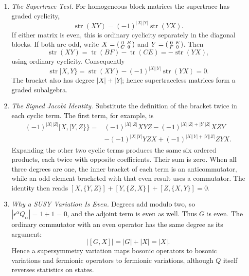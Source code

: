 
\begin{enumerate}
  \begin{enumerate}
    \item \emph{The Supertrace Test.}
    For homogeneous block matrices the supertrace has graded cyclicity,
      \[
        \operatorname{str}(XY)
          =(-1)^{|X||Y|}\operatorname{str}(YX).
      \]
      If either matrix is even, this is ordinary cyclicity separately in the
      diagonal blocks.  If both are odd, write
      \(X=\begin{psmallmatrix}0&B\\C&0\end{psmallmatrix}\) and
      \(Y=\begin{psmallmatrix}0&E\\F&0\end{psmallmatrix}\).  Then
      \[
        \operatorname{str}(XY)=\operatorname{tr}(BF)-\operatorname{tr}(CE)
          =-\operatorname{str}(YX),
      \]
      using ordinary cyclicity.  Consequently
      \[
        \operatorname{str}[X,Y\}
          =\operatorname{str}(XY)
           -(-1)^{|X||Y|}\operatorname{str}(YX)=0.
      \]
      The bracket also has degree \(|X|+|Y|\); hence supertraceless matrices
      form a graded subalgebra.
    \item \emph{The Signed Jacobi Identity.}
    Substitute the definition of the bracket twice in each cyclic term.  The
      first term, for example, is
      \[
      \begin{aligned}
        (-1)^{|X||Z|}[X,[Y,Z\}\}
        ={}&(-1)^{|X||Z|}XYZ
           -(-1)^{|X||Z|+|Y||Z|}XZY\\
          &-(-1)^{|X||Y|}YZX
           +(-1)^{|X||Y|+|Y||Z|}ZYX .
      \end{aligned}
      \]
      Expanding the other two cyclic terms produces the same six ordered
      products, each twice with opposite coefficients.  Their sum is zero.
      When all three degrees are one, the inner bracket of each term is an
      anticommutator, while an odd element bracketed with that even result uses
      a commutator.  The identity then reads
      \([X,\{Y,Z\}]+[Y,\{Z,X\}]+[Z,\{X,Y\}]=0\).
    \item \emph{Why a SUSY Variation Is Even.}
    Degrees add modulo two, so
      \(|\epsilon^\alpha Q_\alpha|=1+1=0\), and the adjoint term is even as
      well.  Thus \(G\) is even.  The ordinary commutator with an even operator
      has the same degree as its argument:
      \[
        |[G,X]|=|G|+|X|=|X|.
      \]
      Hence a supersymmetry variation maps bosonic operators to bosonic
      variations and fermionic operators to fermionic variations, although
      \(Q\) itself reverses statistics on states.


\end{enumerate}
\end{enumerate}
